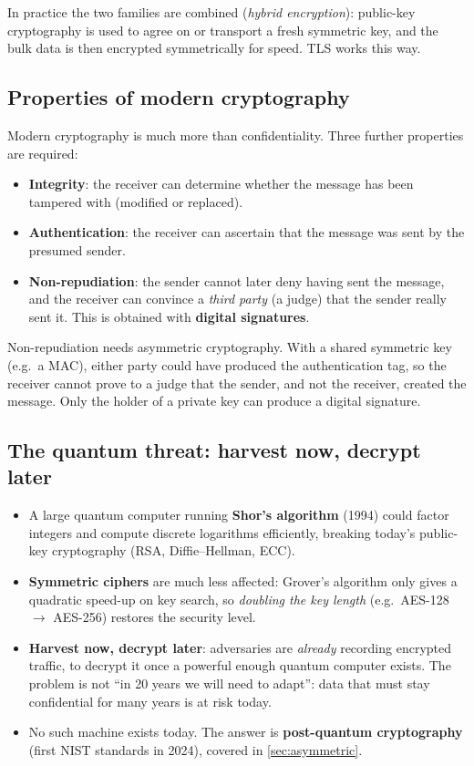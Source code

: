 \begin{remark}
In practice the two families are combined (\emph{hybrid encryption}): public-key cryptography is used to agree on or transport a fresh symmetric key, and the bulk data is then encrypted symmetrically for speed. TLS works this way.
\end{remark}

\subsection{Properties of modern cryptography}

Modern cryptography is much more than confidentiality. Three further properties are required:
\begin{itemize}
    \item \textbf{Integrity}: the receiver can determine whether the message has been tampered with (modified or replaced).
    \item \textbf{Authentication}: the receiver can ascertain that the message was sent by the presumed sender.
    \item \textbf{Non-repudiation}: the sender cannot later deny having sent the message, and the receiver can convince a \emph{third party} (a judge) that the sender really sent it. This is obtained with \textbf{digital signatures}.
\end{itemize}

\begin{remark}
Non-repudiation needs asymmetric cryptography. With a shared symmetric key (e.g.\ a MAC), either party could have produced the authentication tag, so the receiver cannot prove to a judge that the sender, and not the receiver, created the message. Only the holder of a private key can produce a digital signature.
\end{remark}

\subsection{The quantum threat: harvest now, decrypt later}

\begin{itemize}
    \item A large quantum computer running \textbf{Shor's algorithm} (1994) could factor integers and compute discrete logarithms efficiently, breaking today's public-key cryptography (RSA, Diffie--Hellman, ECC).
    \item \textbf{Symmetric ciphers} are much less affected: Grover's algorithm only gives a quadratic speed-up on key search, so \emph{doubling the key length} (e.g.\ AES-128 $\to$ AES-256) restores the security level.
    \item \textbf{Harvest now, decrypt later}: adversaries are \emph{already} recording encrypted traffic, to decrypt it once a powerful enough quantum computer exists. The problem is not \enquote{in 20 years we will need to adapt}: data that must stay confidential for many years is at risk today.
    \item No such machine exists today. The answer is \textbf{post-quantum cryptography} (first NIST standards in 2024), covered in \cref{sec:asymmetric}.
\end{itemize}

